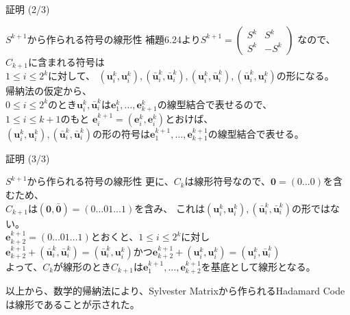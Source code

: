 \documentclass[dvipdfmx,10pt,jsarticle]{beamer}
\begin{document}
  \begin{frame}{証明 (2/3)}
    \begin{block}{$S^{k+1}$から作られる符号の線形性}
      補題6.24より$S^{k+1} = \begin{pmatrix}
        S^k & S^k \\ 
        S^k & - S^k
      \end{pmatrix}$
      なので、$C_{k+1}$に含まれる符号は\\
      $1 \leq i \leq 2^k$に対して、 $(\mathbf{u}^k_i , \mathbf{u}^k_i), (\bar{\mathbf{u}}^k_i, \bar{\mathbf{u}}^k_i), (\mathbf{u}^k_i, \bar{\mathbf{u}}^k_i), (\bar{\mathbf{u}}^k_i, \mathbf{u}^k_i)$の形になる。\\
      帰納法の仮定から、 \\
      $0 \leq i \leq 2^k$のとき$\mathbf{u}^k_i, \bar{\mathbf{u}}^k_i$は$\mathbf{e}^k_1, \ldots, \mathbf{e}^k_{k+1}$の線型結合で表せるので、\\
      $1 \leq i \leq k + 1$のもと $\mathbf{e}^{k+1}_i = ( \mathbf{e}^k_i, \mathbf{e}^k_i )$とおけば、\\
      $(\mathbf{u}^k_i , \mathbf{u}^k_i), (\bar{\mathbf{u}}^k_i, \bar{\mathbf{u}}^k_i)$の形の符号は$\mathbf{e}^{k+1}_1, \ldots, \mathbf{e}^{k+1}_{k+1}$の線型結合で表せる。\\
    \end{block}
  \end{frame}

  \begin{frame}{証明 (3/3)}
    \begin{block}{$S^{k+1}$から作られる符号の線形性}
      更に、$C_k$は線形符号なので、$\mathbf{0} = ( 0 \ldots 0 )$を含むため、\\
      $C_{k+1}$は$(\mathbf{0}, \bar{\mathbf{0}}) = (0\ldots01\ldots 1)$を含み、
      これは$(\mathbf{u}^k_i , \mathbf{u}^k_i), (\bar{\mathbf{u}}^k_i, \bar{\mathbf{u}}^k_i)$の形ではない。\\
      $\mathbf{e}^{k+1}_{k+2} = (0\ldots 01 \ldots 1)$とおくと、$1 \leq i \leq 2^k$に対し \\
      $\mathbf{e}^{k+1}_{k+2} + (\bar{\mathbf{u}}^k_i, \bar{\mathbf{u}}^k_i) = (\bar{\mathbf{u}}^k_i, \mathbf{u}^k_i)$かつ$\mathbf{e}^{k+1}_{k+2} + (\mathbf{u}^k_i, \mathbf{u}^k_i) = (\mathbf{u}^k_i, \bar{\mathbf{u}}^k_i)$\\
      よって、$C_k$が線形のとき$C_{k+1}$は$\mathbf{e}^{k+1}_1 , \ldots, \mathbf{e}^{k+1}_{k+2}$を基底として線形となる。
    \end{block}
    
    以上から、数学的帰納法により、Sylvester Matrixから作られるHadamard Codeは線形であることが示された。
  \end{frame}
\end{document}
